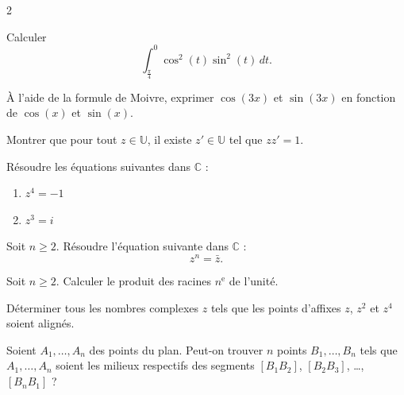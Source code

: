 \documentclass[a4paper,12pt]{article}
\begin{document}
\begin{multicols}{2}
\begin{exercice}[title=Exercice 6 \quad$\star\star$\quad\ {[}Calculer{]}]{}{}
Calculer
\[
\int_{\frac{\pi}{4}}^{0} \cos^2(t) \sin^2(t) \, dt.
\]
\end{exercice}

\begin{exercice}[title=Exercice 7 \quad$\star\star$\quad\ {[}Calculer{]}]{}{}
À l’aide de la formule de Moivre, exprimer \( \cos(3x) \) et \( \sin(3x) \) en fonction de \( \cos(x) \) et \( \sin(x) \).
\end{exercice}

\begin{exercice}[title={Exercice 8 \quad$\star\star$\quad\ [Raisonner]}]{}{}
Montrer que pour tout \( z \in \mathbb{U} \), il existe \( z' \in \mathbb{U} \) tel que \( zz' = 1 \).
\end{exercice}

\begin{exercice}[title=Exercice 9 \quad$\star\star$\quad\ {[}Calculer{]}]{}{}
Résoudre les équations suivantes dans \( \mathbb{C} \) :
\begin{enumerate}
    \item \( z^4 = -1 \)
    \item \( z^3 = i \)
\end{enumerate}
\end{exercice}

\begin{exercice}[title=Exercice 10 \quad$\star\star$\quad\ {[}Calculer{]}]{}{}
Soit \( n \geq 2 \). Résoudre l’équation suivante dans \( \mathbb{C} \) :
\[
z^n = \bar{z}.
\]
\end{exercice}

\begin{exercice}[title=Exercice 11 \quad$\star\star$\quad\ {[}Calculer{]}]{}{}
Soit \( n \geq 2 \). Calculer le produit des racines \( n^{\text{e}} \) de l’unité.
\end{exercice}

\begin{exercice}[title={Exercice 12 \quad$\star\star$\quad\ {[}Calculer, Chercher{]}}]{}{}
Déterminer tous les nombres complexes \( z \) tels que les points d’affixes \( z \), \( z^2 \) et \( z^4 \) soient alignés.
\end{exercice}

\begin{exercice}[title={Exercice 13 \quad$\star\star\star$\quad\ {[}Chercher, Représenter{]}}]{}{}
Soient \( A_1, \dots, A_n \) des points du plan. Peut-on trouver \( n \) points \( B_1, \dots, B_n \) tels que \( A_1, \dots, A_n \) soient les milieux respectifs des segments \([B_1B_2]\), \([B_2B_3]\), \dots, \([B_nB_1]\) ?
\end{exercice}


\end{multicols}
\end{document}
